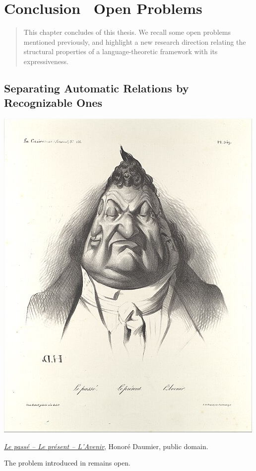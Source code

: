 \chapter[Conclusion \&~Open Problems]{Conclusion \fancyand~Open Problems}
\label{ch:conclu-automatic}
\renewcommand\thefigure{\thechapter.\arabic{figure}}

\begin{chapterpresentation}
	\begin{abstract}
		This chapter concludes  of this thesis.
		We recall some open problems mentioned previously,
		and highlight a new research direction relating the
		structural properties of a language-theoretic framework
		with its expressiveness.
	\end{abstract}
	\par\bigskip\bigskip
	\chaptertoc
\end{chapterpresentation}

\section{Separating Automatic Relations by Recognizable Ones}

\begin{marginfigure}
	\centering
	\includegraphics[width=\linewidth]{fig/PastPresentFuture.jpg}
	\caption{\href{https://www.metmuseum.org/art/collection/search/365043}{\emph{Le passé – Le présent – L'Avenir}}, Honoré Daumier, public domain.}
\end{marginfigure}
The problem introduced in 
remains open.

